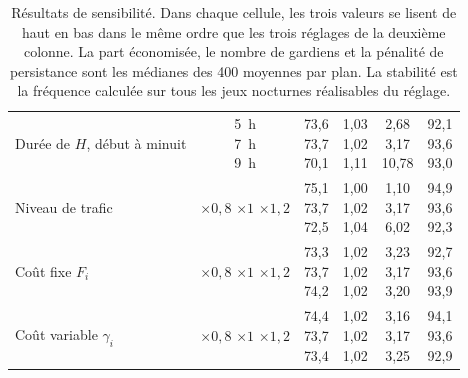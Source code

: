 \begin{table}[htbp]
\begin{tabular}{lccccc}
\shortstack[l]{Durée de \(H\),\\début à minuit} &
\shortstack{5~h\\7~h\\9~h} &
\shortstack{73,6\\73,7\\70,1} &
\shortstack{1,03\\1,02\\1,11} &
\shortstack{2,68\\3,17\\10,78} &
\shortstack{92,1\\93,6\\93,0} \\[2pt]
Niveau de trafic &
\shortstack{\(\times0{,}8\)\\\(\times1\)\\\(\times1{,}2\)} &
\shortstack{75,1\\73,7\\72,5} &
\shortstack{1,00\\1,02\\1,04} &
\shortstack{1,10\\3,17\\6,02} &
\shortstack{94,9\\93,6\\92,3} \\[2pt]
Coût fixe \(F_i\) &
\shortstack{\(\times0{,}8\)\\\(\times1\)\\\(\times1{,}2\)} &
\shortstack{73,3\\73,7\\74,2} &
\shortstack{1,02\\1,02\\1,02} &
\shortstack{3,23\\3,17\\3,20} &
\shortstack{92,7\\93,6\\93,9} \\[2pt]
Coût variable \(\gamma_i\) &
\shortstack{\(\times0{,}8\)\\\(\times1\)\\\(\times1{,}2\)} &
\shortstack{74,4\\73,7\\73,4} &
\shortstack{1,02\\1,02\\1,02} &
\shortstack{3,16\\3,17\\3,25} &
\shortstack{94,1\\93,6\\92,9} \\
\hline
\end{tabular}
\caption{Résultats de sensibilité. Dans chaque cellule, les trois valeurs se
lisent de haut en bas dans le même ordre que les trois réglages de la deuxième
colonne. La part économisée, le nombre de gardiens et la pénalité de
persistance sont les médianes des 400 moyennes par plan. La stabilité est la
fréquence calculée sur tous les jeux nocturnes réalisables du réglage.}
\label{tab:plan_sensibilite}
\end{table}

